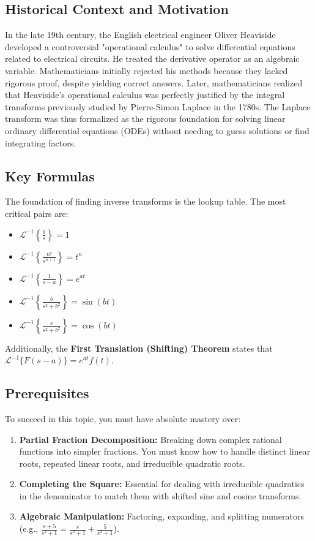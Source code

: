 \documentclass[11pt, a4paper]{article}
\theoremstyle{definition}
\theoremstyle{remark}
\newcommand{\InvLaplace}{\mathcal{L}^{-1}}
\begin{document}
\subsection{Historical Context and Motivation}
In the late 19th century, the English electrical engineer Oliver Heaviside developed a controversial "operational calculus" to solve differential equations related to electrical circuits. He treated the derivative operator as an algebraic variable. Mathematicians initially rejected his methods because they lacked rigorous proof, despite yielding correct answers. Later, mathematicians realized that Heaviside's operational calculus was perfectly justified by the integral transforms previously studied by Pierre-Simon Laplace in the 1780s. The Laplace transform was thus formalized as the rigorous foundation for solving linear ordinary differential equations (ODEs) without needing to guess solutions or find integrating factors.

\subsection{Key Formulas}
The foundation of finding inverse transforms is the lookup table. The most critical pairs are:
\begin{itemize}
    \item $\InvLaplace\left\{ \frac{1}{s} \right\} = 1$
    \item $\InvLaplace\left\{ \frac{n!}{s^{n+1}} \right\} = t^n$
    \item $\InvLaplace\left\{ \frac{1}{s-a} \right\} = e^{at}$
    \item $\InvLaplace\left\{ \frac{b}{s^2 + b^2} \right\} = \sin(bt)$
    \item $\InvLaplace\left\{ \frac{s}{s^2 + b^2} \right\} = \cos(bt)$
\end{itemize}
Additionally, the \textbf{First Translation (Shifting) Theorem} states that $\InvLaplace\{F(s-a)\} = e^{at}f(t)$.

\subsection{Prerequisites}
To succeed in this topic, you must have absolute mastery over:
\begin{enumerate}
    \item \textbf{Partial Fraction Decomposition:} Breaking down complex rational functions into simpler fractions. You must know how to handle distinct linear roots, repeated linear roots, and irreducible quadratic roots.
    \item \textbf{Completing the Square:} Essential for dealing with irreducible quadratics in the denominator to match them with shifted sine and cosine transforms.
    \item \textbf{Algebraic Manipulation:} Factoring, expanding, and splitting numerators (e.g., $\frac{s+5}{s^2+1} = \frac{s}{s^2+1} + \frac{5}{s^2+1}$).
\end{enumerate}
\end{document}
